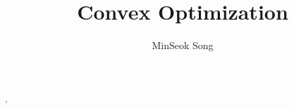 \documentclass{article}
\title{Convex Optimization}
\author{MinSeok Song}
\date{}
\theoremstyle{remark}
\begin{document}
. 
\end{document}
